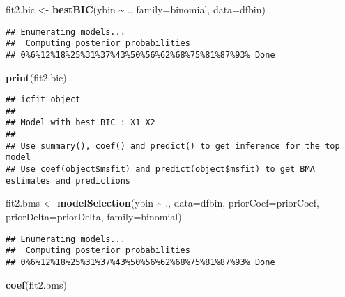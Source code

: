 \documentclass[
]{book}
\newenvironment{Shaded}{\begin{snugshade}}{\end{snugshade}}
\newcommand{\AttributeTok}[1]{\textcolor[rgb]{0.13,0.29,0.53}{#1}}
\newcommand{\FunctionTok}[1]{\textcolor[rgb]{0.13,0.29,0.53}{\textbf{#1}}}
\newcommand{\NormalTok}[1]{#1}
\newcommand{\OtherTok}[1]{\textcolor[rgb]{0.56,0.35,0.01}{#1}}
\newcommand{\SpecialCharTok}[1]{\textcolor[rgb]{0.81,0.36,0.00}{\textbf{#1}}}
\newcommand{\StringTok}[1]{\textcolor[rgb]{0.31,0.60,0.02}{#1}}
\theoremstyle{definition}
\theoremstyle{definition}
\theoremstyle{definition}
\theoremstyle{definition}
\theoremstyle{remark}
\begin{document}
\begin{Shaded}
\begin{Highlighting}[]
\NormalTok{fit2.bic }\OtherTok{\textless{}{-}} \FunctionTok{bestBIC}\NormalTok{(ybin }\SpecialCharTok{\textasciitilde{}}\NormalTok{ ., }\AttributeTok{family=}\StringTok{\textquotesingle{}binomial\textquotesingle{}}\NormalTok{, }\AttributeTok{data=}\NormalTok{dfbin)}
\end{Highlighting}
\end{Shaded}

\begin{verbatim}
## Enumerating models...
##  Computing posterior probabilities
## 0%6%12%18%25%31%37%43%50%56%62%68%75%81%87%93% Done
\end{verbatim}

\begin{Shaded}
\begin{Highlighting}[]
\FunctionTok{print}\NormalTok{(fit2.bic)}
\end{Highlighting}
\end{Shaded}

\begin{verbatim}
## icfit object
## 
## Model with best BIC : X1 X2 
## 
## Use summary(), coef() and predict() to get inference for the top model
## Use coef(object$msfit) and predict(object$msfit) to get BMA estimates and predictions
\end{verbatim}

\begin{Shaded}
\begin{Highlighting}[]
\NormalTok{fit2.bms }\OtherTok{\textless{}{-}} \FunctionTok{modelSelection}\NormalTok{(ybin }\SpecialCharTok{\textasciitilde{}}\NormalTok{ ., }\AttributeTok{data=}\NormalTok{dfbin,}
                     \AttributeTok{priorCoef=}\NormalTok{priorCoef,}
                     \AttributeTok{priorDelta=}\NormalTok{priorDelta,}
                     \AttributeTok{family=}\StringTok{\textquotesingle{}binomial\textquotesingle{}}\NormalTok{)}
\end{Highlighting}
\end{Shaded}

\begin{verbatim}
## Enumerating models...
##  Computing posterior probabilities
## 0%6%12%18%25%31%37%43%50%56%62%68%75%81%87%93% Done
\end{verbatim}

\begin{Shaded}
\begin{Highlighting}[]
\FunctionTok{coef}\NormalTok{(fit2.bms)}
\end{Highlighting}
\end{Shaded}
\end{document}
